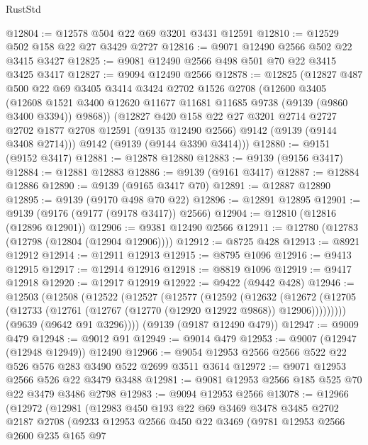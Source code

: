 \begin{lexlean}{RustStd}
\begin{coremodule}
@12804 := @12578 @504 @22 @69 @3201 @3431 @12591
@12810 := @12529 @502 @158 @22 @27 @3429 @2727
@12816 := @9071 @12490 @2566 @502 @22 @3415 @3427
@12825 := @9081 @12490 @2566 @498 @501 @70 @22 @3415 @3425 @3417
@12827 := @9094 @12490 @2566
@12878 := @12825
    (@12827
      @487
      @500
      @22
      @69
      @3405
      @3414
      @3424
      @2702
      @1526
      @2708
      (@12600
        @3405
        (@12608 @1521 @3400 @12620 @11677 @11681 @11685 @9738 (@9139 (@9860 @3400 @3394)) @9868))
      (@12827
        @420
        @158
        @22
        @27
        @3201
        @2714
        @2727
        @2702
        @1877
        @2708
        @12591
        (@9135 @12490 @2566)
        @9142
        (@9139 (@9144 @3408 @2714)))
      @9142
      (@9139 (@9144 @3390 @3414)))
@12880 := @9151 (@9152 @3417)
@12881 := @12878 @12880
@12883 := @9139 (@9156 @3417)
@12884 := @12881 @12883
@12886 := @9139 (@9161 @3417)
@12887 := @12884 @12886
@12890 := @9139 (@9165 @3417 @70)
@12891 := @12887 @12890
@12895 := @9139 (@9170 @498 @70 @22)
@12896 := @12891 @12895
@12901 := @9139 (@9176 (@9177 (@9178 @3417)) @2566)
@12904 := @12810 (@12816 (@12896 @12901))
@12906 := @9381 @12490 @2566
@12911 := @12780 (@12783 (@12798 (@12804 (@12904 @12906))))
@12912 := @8725 @428
@12913 := @8921 @12912
@12914 := @12911 @12913
@12915 := @8795 @1096
@12916 := @9413 @12915
@12917 := @12914 @12916
@12918 := @8819 @1096
@12919 := @9417 @12918
@12920 := @12917 @12919
@12922 := @9422 (@9442 @428)
@12946 := @12503
    (@12508
      (@12522
        (@12527
          (@12577
            (@12592
              (@12632
                (@12672
                  (@12705 (@12733 (@12761 (@12767 (@12770 (@12920 @12922 @9868)) @12906)))))))))
        (@9639 (@9642 @91 @3296))))
    (@9139 (@9187 @12490 @479))
@12947 := @9009 @479
@12948 := @9012 @91
@12949 := @9014 @479
@12953 := @9007 (@12947 (@12948 @12949)) @12490
@12966 := @9054 @12953 @2566 @2566 @522 @22 @526 @576 @283 @3490 @522 @2699 @3511 @3614
@12972 := @9071 @12953 @2566 @526 @22 @3479 @3488
@12981 := @9081 @12953 @2566 @185 @525 @70 @22 @3479 @3486 @2798
@12983 := @9094 @12953 @2566
@13078 := @12966
    (@12972
      (@12981
        (@12983
          @450
          @193
          @22
          @69
          @3469
          @3478
          @3485
          @2702
          @2187
          @2708
          (@9233
            @12953
            @2566
            @450
            @22
            @3469
            (@9781
              @12953
              @2566
              @2600
              @235
              @165
              @97

\end{coremodule}
\end{lexlean}
